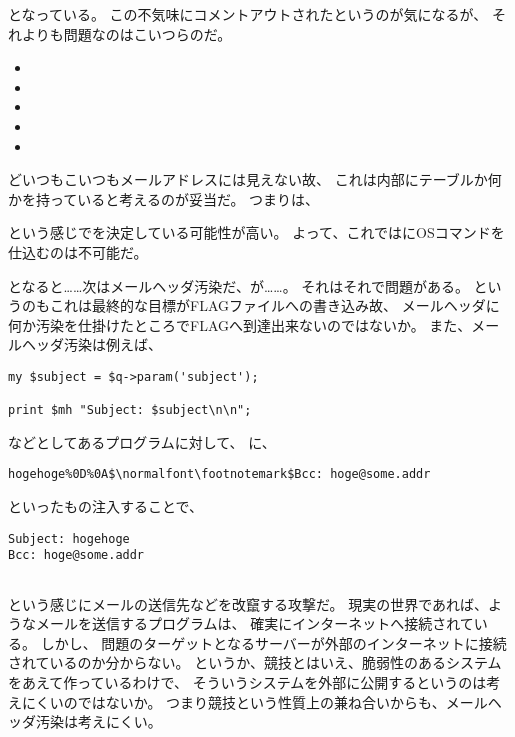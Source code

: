 となっている。
この不気味にコメントアウトされたというのが気になるが、
それよりも問題なのはこいつらのだ。

\begin{itemize}
	\item {}
	\item {}
	\item {}
	\item {}
	\item {}
\end{itemize}

どいつもこいつもメールアドレスには見えない故、
これは内部にテーブルか何かを持っていると考えるのが妥当だ。
つまりは、



という感じでを決定している可能性が高い。
よって、これではにOSコマンドを仕込むのは不可能だ。

となると……次はメールヘッダ汚染だ、が……。
それはそれで問題がある。
というのもこれは最終的な目標がFLAGファイルへの書き込み故、
メールヘッダに何か汚染を仕掛けたところでFLAGへ到達出来ないのではないか。
また、メールヘッダ汚染は例えば、

\begin{lstlisting}[style=perl]
my $subject = $q->param('subject');

print $mh "Subject: $subject\n\n";
\end{lstlisting}

などとしてあるプログラムに対して、
に、

\begin{lstlisting}[mathescape]
hogehoge%0D%0A$\normalfont\footnotemark$Bcc: hoge@some.addr
\end{lstlisting}

といったもの注入することで、

\begin{lstlisting}
Subject: hogehoge
Bcc: hoge@some.addr


\end{lstlisting}

という感じにメールの送信先などを改竄する攻撃だ。
現実の世界であれば、ようなメールを送信するプログラムは、
確実にインターネットへ接続されている。
しかし、
問題のターゲットとなるサーバーが外部のインターネットに接続されているのか分からない。
というか、競技とはいえ、脆弱性のあるシステムをあえて作っているわけで、
そういうシステムを外部に公開するというのは考えにくいのではないか。
つまり競技という性質上の兼ね合いからも、メールヘッダ汚染は考えにくい。

